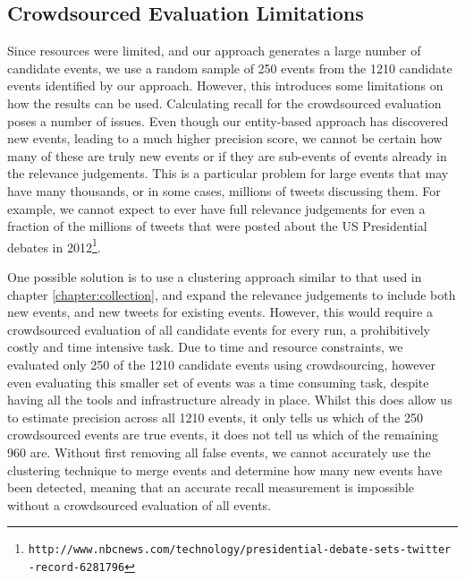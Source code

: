 \subsection{Crowdsourced Evaluation Limitations}
Since resources were limited, and our approach generates a large number of candidate events, we use a random sample of 250 events from the 1210 candidate events identified by our approach.
However, this introduces some limitations on how the results can be used.
Calculating recall for the crowdsourced evaluation poses a number of issues.
Even though our entity-based approach has discovered new events, leading to a much higher precision score, we cannot be certain how many of these are truly new events or if they are sub-events of events already in the relevance judgements.
This is a particular problem for large events that may have many thousands, or in some cases, millions of tweets discussing them.
For example, we cannot expect to ever have full relevance judgements for even a fraction of the millions of tweets that were posted about the US Presidential debates in 2012\footnote{\texttt{http://www.nbcnews.com/technology/presidential-debate-sets-twitter\\-record-6281796}}.

One possible solution is to use a clustering approach similar to that used in chapter \ref{chapter:collection}, and expand the relevance judgements to include both new events, and new tweets for existing events.
However, this would require a crowdsourced evaluation of all candidate events for every run, a prohibitively costly and time intensive task.
Due to time and resource constraints, we evaluated only 250 of the 1210 candidate events using crowdsourcing, however even evaluating this smaller set of events was a time consuming task, despite having all the tools and infrastructure already in place.
Whilst this does allow us to estimate precision across all 1210 events, it only tells us which of the 250 crowdsourced events are true events, it does not tell us which of the remaining 960 are.
Without first removing all false events, we cannot accurately use the clustering technique to merge events and determine how many new events have been detected, meaning that an accurate recall measurement is impossible without a crowdsourced evaluation of all events.